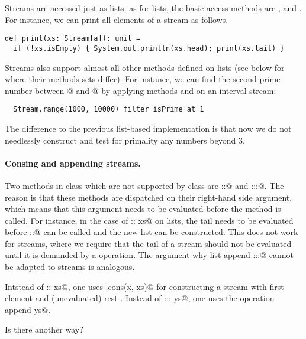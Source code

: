 \documentclass[11pt]{book}
\begin{document}
Streams are accessed just as lists. as for lists, the basic access
methods are \verb@isEmpty@, \verb@head@ and \verb@tail@. For instance,
we can print all elements of a stream as follows.
\begin{verbatim}
def print(xs: Stream[a]): unit = 
  if (!xs.isEmpty) { System.out.println(xs.head); print(xs.tail) }
\end{verbatim}
Streams also support almost all other methods defined on lists (see
below for where their methods sets differ). For instance, we can find
the second prime number between @ and @ by applying methods
\verb@filter@ and \verb@at@ on an interval stream:
\begin{verbatim}
  Stream.range(1000, 10000) filter isPrime at 1
\end{verbatim}
The difference to the previous list-based implementation is that now
we do not needlessly construct and test for primality any numbers
beyond 3.

\paragraph{Consing and appending streams.} Two methods in class \verb@List@
which are not supported by class \verb@Stream@ are \verb@::@ and
\verb@:::@.  The reason is that these methods are dispatched on their
right-hand side argument, which means that this argument needs to be
evaluated before the method is called. For instance, in the case of
\verb@x :: xs@ on lists, the tail \verb@xs@ needs to be evaluated
before \verb@::@ can be called and the new list can be constructed.
This does not work for streams, where we require that the tail of a
stream should not be evaluated until it is demanded by a \verb@tail@ operation.
The argument why list-append \verb@:::@ cannot be adapted to streams is analogous.

Intstead of \verb@x :: xs@, one uses \verb@Stream.cons(x, xs)@ for
constructing a stream with first element \verb@x@ and (unevaluated)
rest \verb@xs@.  Instead of \verb@xs ::: ys@, one uses the operation
\verb@xs append ys@.  

{Is there another way?}




\end{document}
